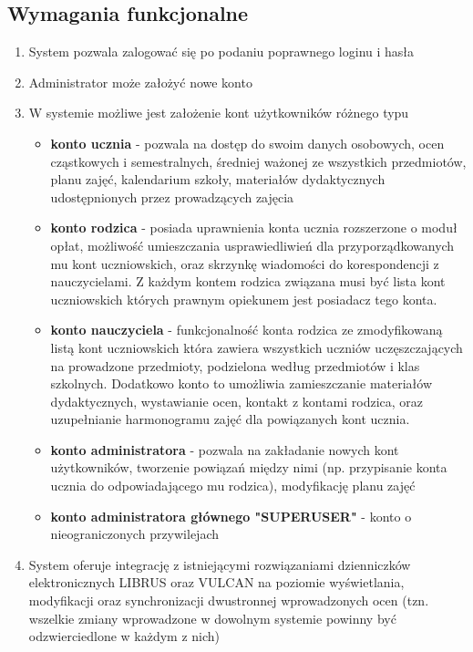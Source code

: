 \documentclass{article}
\begin{document}
\subsection{Wymagania funkcjonalne}
\begin{enumerate}
    \item System pozwala zalogować się po podaniu poprawnego loginu i hasła
    \item Administrator może założyć nowe konto
    \item W systemie możliwe jest założenie kont użytkowników różnego typu
    \begin{itemize}
        \item \textbf{konto ucznia} - pozwala na dostęp do swoim danych osobowych, ocen cząstkowych i semestralnych, średniej ważonej ze wszystkich przedmiotów, planu zajęć, kalendarium szkoły, materiałów dydaktycznych udostępnionych przez prowadzących zajęcia
        \item \textbf{konto rodzica} - posiada uprawnienia konta ucznia rozszerzone o moduł opłat, możliwość umieszczania usprawiedliwień dla przyporządkowanych mu kont uczniowskich, oraz skrzynkę wiadomości do korespondencji z nauczycielami. Z każdym kontem rodzica związana musi być lista kont uczniowskich których prawnym opiekunem jest posiadacz tego konta.
        \item \textbf{konto nauczyciela} - funkcjonalność konta rodzica ze zmodyfikowaną listą kont uczniowskich która zawiera wszystkich uczniów uczęszczających na prowadzone przedmioty, podzielona według przedmiotów i klas szkolnych. Dodatkowo konto to umożliwia zamieszczanie materiałów dydaktycznych, wystawianie ocen, kontakt z kontami rodzica, oraz uzupełnianie harmonogramu zajęć dla powiązanych kont ucznia.
        \item \textbf{konto administratora} - pozwala na zakładanie nowych kont użytkowników, tworzenie powiązań między nimi (np. przypisanie konta ucznia do odpowiadającego mu rodzica), modyfikację planu zajęć
        \item \textbf{konto administratora głównego "SUPERUSER"} - konto o nieograniczonych przywilejach     
    \end{itemize}
    \item System oferuje integrację z istniejącymi rozwiązaniami dzienniczków elektronicznych LIBRUS oraz VULCAN na poziomie wyświetlania, modyfikacji oraz synchronizacji dwustronnej wprowadzonych ocen (tzn. wszelkie zmiany wprowadzone w dowolnym systemie powinny być odzwierciedlone w każdym z nich)

\end{enumerate}
\end{document}
